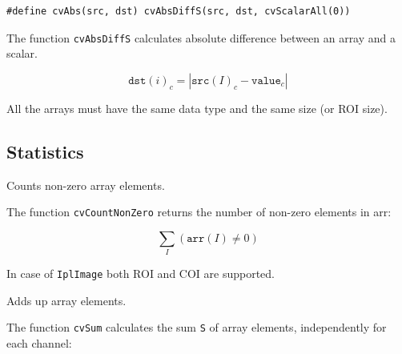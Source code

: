 \begin{lstlisting}
#define cvAbs(src, dst) cvAbsDiffS(src, dst, cvScalarAll(0))
\end{lstlisting}

\begin{description}
\end{description}

The function \texttt{cvAbsDiffS} calculates absolute difference between an array and a scalar.

\[ \texttt{dst}(i)_c = |\texttt{src}(I)_c - \texttt{value}_c| \]

All the arrays must have the same data type and the same size (or ROI size).

\subsection{Statistics}

\label{CountNonZero}

Counts non-zero array elements.


\begin{description}
\end{description}


The function \texttt{cvCountNonZero} returns the number of non-zero elements in arr:

\[ \sum_I (\texttt{arr}(I) \ne 0) \]

In case of \texttt{IplImage} both ROI and COI are supported.


\label{Sum}

Adds up array elements.


\begin{description}
\end{description}


The function \texttt{cvSum} calculates the sum \texttt{S} of array elements, independently for each channel:

